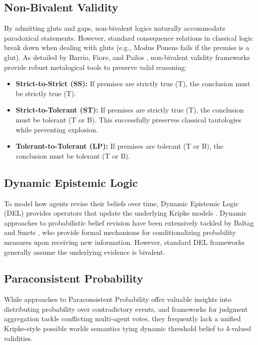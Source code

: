 \documentclass[11pt,a4paper]{article}
\begin{document}
\subsection{Non-Bivalent Validity}
By admitting gluts and gaps, non-bivalent logics naturally accommodate paradoxical statements. However, standard consequence relations in classical logic break down when dealing with gluts (e.g., Modus Ponens fails if the premise is a glut). As detailed by Barrio, Fiore, and Pailos \cite{barrio2025non}, non-bivalent validity frameworks provide robust metalogical tools to preserve valid reasoning:
\begin{itemize}
    \item \textbf{Strict-to-Strict (SS):} If premises are strictly true (T), the conclusion must be strictly true (T).
    \item \textbf{Strict-to-Tolerant (ST):} If premises are strictly true (T), the conclusion must be tolerant (T or B). This successfully preserves classical tautologies while preventing explosion.
    \item \textbf{Tolerant-to-Tolerant (LP):} If premises are tolerant (T or B), the conclusion must be tolerant (T or B).
\end{itemize}

\subsection{Dynamic Epistemic Logic}
To model how agents revise their beliefs over time, Dynamic Epistemic Logic (DEL) provides operators that update the underlying Kripke models \cite{vanbenthem2011}. Dynamic approaches to probabilistic belief revision have been extensively tackled by Baltag and Smets \cite{baltag2008probabilistic}, who provide formal mechanisms for conditionalizing probability measures upon receiving new information. However, standard DEL frameworks generally assume the underlying evidence is bivalent.

\subsection{Paraconsistent Probability}
While approaches to Paraconsistent Probability \cite{priest1979} offer valuable insights into distributing probability over contradictory events, and frameworks for judgment aggregation \cite{list2002} tackle conflicting multi-agent votes, they frequently lack a unified Kripke-style possible worlds semantics tying dynamic threshold belief to 4-valued validities.
\end{document}
